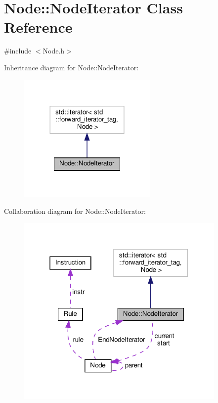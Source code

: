 \hypertarget{class_node_1_1_node_iterator}{}\section{Node\+:\+:Node\+Iterator Class Reference}
\label{class_node_1_1_node_iterator}


{\ttfamily \#include $<$Node.\+h$>$}



Inheritance diagram for Node\+:\+:Node\+Iterator\+:\nopagebreak
\begin{figure}[H]
\begin{center}
\leavevmode
\includegraphics[width=192pt]{class_node_1_1_node_iterator__inherit__graph}
\end{center}
\end{figure}


Collaboration diagram for Node\+:\+:Node\+Iterator\+:\nopagebreak
\begin{figure}[H]
\begin{center}
\leavevmode
\includegraphics[width=289pt]{class_node_1_1_node_iterator__coll__graph}
\end{center}
\end{figure}
